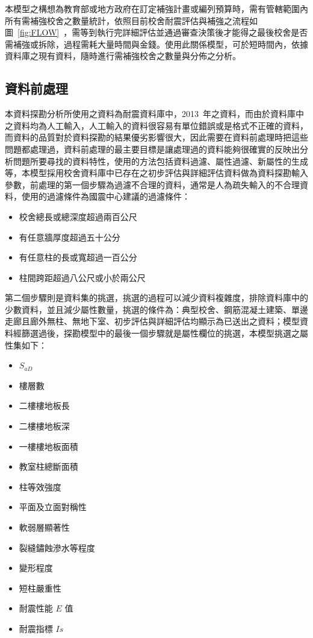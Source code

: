 本模型之構想為教育部或地方政府在訂定補強計畫或編列預算時，需有管轄範圍內所有需補強校舍之數量統計，依照目前校舍耐震評估與補強之流程如圖~\ref{fig:FLOW}~，需等到執行完詳細評估並通過審查決策後才能得之最後校舍是否需補強或拆除，過程需耗大量時間與金錢。使用此關係模型，可於短時間內，依據資料庫之現有資料，隨時進行需補強校舍之數量與分佈之分析。

\subsection{資料前處理}

本資料探勘分析所使用之資料為耐震資料庫中，2013~年之資料，而由於資料庫中之資料均為人工輸入，人工輸入的資料很容易有單位錯誤或是格式不正確的資料，而資料的品質對於資料探勘的結果優劣影響很大，因此需要在資料前處理時把這些問題都處理過，資料前處理的最主要目標是讓處理過的資料能夠很確實的反映出分析問題所要尋找的資料特性，使用的方法包括資料過濾、屬性過濾、新屬性的生成等，本模型採用校舍資料庫中已存在之初步評估與詳細評估資料做為資料探勘輸入參數，前處理的第一個步驟為過濾不合理的資料，通常是人為疏失輸入的不合理資料，使用的過濾條件為國震中心建議的過濾條件：

\begin{itemize}
\item 校舍總長或總深度超過兩百公尺
\item 有任意牆厚度超過五十公分
\item 有任意柱的長或寬超過一百公分
\item 柱間跨距超過八公尺或小於兩公尺
\end{itemize}

第二個步驟則是資料集的挑選，挑選的過程可以減少資料複雜度，排除資料庫中的少數資料，並且減少屬性數量，挑選的條件為：典型校舍、鋼筋混凝土建築、單邊走廊且廊外無柱、無地下室、初步評估與詳細評估均顯示為已送出之資料；模型資料經篩選過後，探勘模型中的最後一個步驟就是屬性欄位的挑選，本模型挑選之屬性集如下：


\begin{multicols}{2}
\begin{itemize}
\item $S_{aD}$
\item 樓層數
\item 二樓樓地板長
\item 二樓樓地板深
\item 一樓樓地板面積
\item 教室柱總斷面積
\item 柱等效強度
\item 平面及立面對稱性
\item 軟弱層顯著性
\item 裂縫鏽蝕滲水等程度
\item 變形程度
\item 短柱嚴重性
\item 耐震性能 $E$ 值
\item 耐震指標 $Is$
\end{itemize}
\end{multicols}

